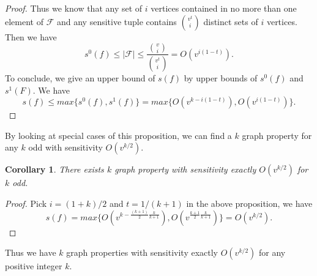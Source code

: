 \documentclass[psamsfonts]{amsart}
\newtheorem{cor}[theorem]{Corollary}
\theoremstyle{definition}
\theoremstyle{remark}
\numberwithin{equation}{section}
\begin{document}
\begin{proof}
		\indent Thus we know that any set of $i$ vertices contained in no more than one element of $\mathcal{F}$ and any sensitive tuple contains $v^t \choose{i}$ distinct sets of $i$ vertices. Then we have
		\begin{equation}
			s^0(f) \leq |\mathcal{F}| \leq \frac{{v \choose{i}}}{{v^t \choose{i}}} = O(v^{i(1-t)}).
		\end{equation}
		To conclude, we give an upper bound of $s(f)$ by upper bounds of $s^0(f)$ and $s^1(F)$. We have
		\begin{equation}
			s(f) \leq max\{s^0(f),s^1(f)\} = max\{ O(v^{k-i(1-t)}), O(v^{i(1-t)})\}.
		\end{equation}
	\end{proof}
	
	By looking at special cases of this proposition, we can find a $k$ graph property for any $k$ odd with sensitivity $O(v^{k/2})$.
	\begin{cor}
		There exists $k$ graph property with sensitivity exactly $O(v^{k/2})$ for $k$ odd.
	\end{cor}
	\begin{proof}
		Pick $i=(1+k)/2$ and $t = 1/(k+1)$ in the above proposition, we have
		\begin{equation}
			s(f) = max\{O(v^{k- \frac{(k+1)}{2}  \frac{k}{k+1}}), O(v^{\frac{k+1}{2}  \frac{k}{k+1}})\} = O(v^{k/2}).
		\end{equation}
	\end{proof}
	Thus we have $k$ graph properties with sensitivity exactly $O(v^{k/2})$ for any positive integer $k$.
	
\end{document}
